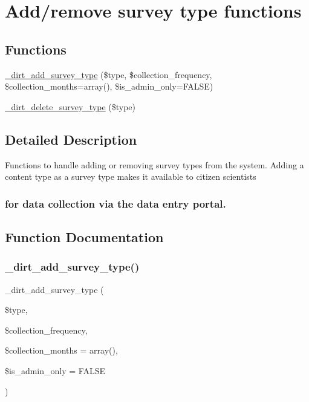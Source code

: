 \hypertarget{group__addremove}{}\section{Add/remove survey type functions}
\label{group__addremove}
\subsection*{Functions}
\begin{DoxyCompactItemize}
\item 
\mbox{\hyperlink{group__addremove_gaed945245ecae97ebf2928aa638cc4828}{\+\_\+dirt\+\_\+add\+\_\+survey\+\_\+type}} (\$type, \$collection\+\_\+frequency, \$collection\+\_\+months=array(), \$is\+\_\+admin\+\_\+only=F\+A\+L\+SE)
\item 
\mbox{\hyperlink{group__addremove_ga6d4ede5a8bdb2b158700756e4a1047f7}{\+\_\+dirt\+\_\+delete\+\_\+survey\+\_\+type}} (\$type)
\end{DoxyCompactItemize}


\subsection{Detailed Description}




Functions to handle adding or removing survey types from the system. Adding a content type as a survey type makes it available to citizen scientists \subsubsection*{for data collection via the data entry portal. }

\subsection{Function Documentation}
\mbox{\label{group__addremove_gaed945245ecae97ebf2928aa638cc4828}} 
\subsubsection{\texorpdfstring{\+\_\+dirt\+\_\+add\+\_\+survey\+\_\+type()}{\_dirt\_add\_survey\_type()}}
{\footnotesize\ttfamily \+\_\+dirt\+\_\+add\+\_\+survey\+\_\+type (\begin{DoxyParamCaption}\item[{}]{\$type,  }\item[{}]{\$collection\+\_\+frequency,  }\item[{}]{\$collection\+\_\+months = {\ttfamily array()},  }\item[{}]{\$is\+\_\+admin\+\_\+only = {\ttfamily FALSE} }\end{DoxyParamCaption})}

